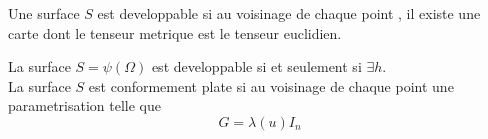 \documentclass[../main.tex]{subfiles}
\begin{document}
\begin{defn}
	Une surface $S$ est developpable si au voisinage de chaque point , il existe une carte dont le tenseur metrique est le tenseur euclidien.
\end{defn}
\begin{rmq}
La surface $S= \psi( \Omega) $ est developpable si et seulement si $\exists h$.\\
La surface $S$ est conformement plate si au voisinage de chaque point une parametrisation telle que
\[ 
G = \lambda(u) I_n
\]

\end{rmq}
	
\end{document}
